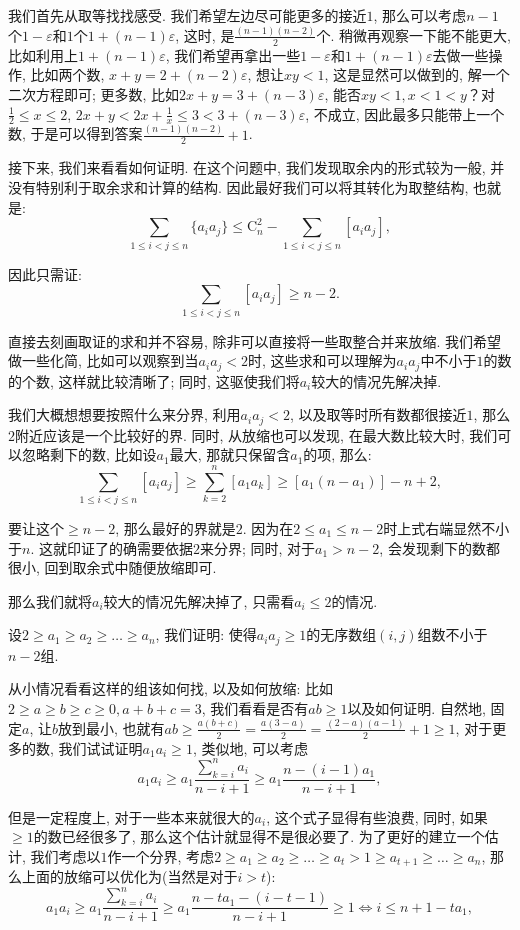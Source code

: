 \documentclass[lang=cn,12pt,thmcnt=section]{elegantbook}
\begin{document}
\begin{analysis}
我们首先从取等找找感受. 我们希望左边尽可能更多的接近$1$, 那么可以考虑$n-1$个$1-\varepsilon$和$1$个$1+(n-1)\varepsilon$, 这时, 是$\frac{(n-1)(n-2)}{2}$个. 稍微再观察一下能不能更大, 比如利用上$1+(n-1)\varepsilon$, 我们希望再拿出一些$1-\varepsilon$和$1+(n-1)\varepsilon$去做一些操作, 比如两个数, $x+y=2+(n-2)\varepsilon$, 想让$xy<1$, 这是显然可以做到的, 解一个二次方程即可; 更多数, 比如$2x+y=3+(n-3)\varepsilon$, 能否$xy<1,x<1<y$？对$\frac{1}{2}\le x\le 2$, $2x+y<2x+\frac{1}{x}\le 3<3+(n-3)\varepsilon$, 不成立, 因此最多只能带上一个数, 于是可以得到答案$\frac{(n-1)(n-2)}{2}+1$.

接下来, 我们来看看如何证明. 在这个问题中, 我们发现取余内的形式较为一般, 并没有特别利于取余求和计算的结构. 因此最好我们可以将其转化为取整结构, 也就是: 
\[
\sum_{1\le i<j\le n}\{a_ia_j\}\le \mathrm{C}_{n}^2 -\sum_{1\le i<j \le n}[a_ia_j],
\]

因此只需证: 
\[
\sum_{1\le i<j \le n}[a_ia_j]\ge n-2.
\]

直接去刻画取证的求和并不容易, 除非可以直接将一些取整合并来放缩. 我们希望做一些化简, 比如可以观察到当$a_ia_j<2$时, 这些求和可以理解为$a_ia_j$中不小于$1$的数的个数, 这样就比较清晰了; 同时, 这驱使我们将$a_i$较大的情况先解决掉. 

我们大概想想要按照什么来分界, 利用$a_ia_j<2$, 以及取等时所有数都很接近$1$, 那么$2$附近应该是一个比较好的界. 同时, 从放缩也可以发现, 在最大数比较大时, 我们可以忽略剩下的数, 比如设$a_1$最大, 那就只保留含$a_1$的项, 那么: 
\[
\sum_{1\le i<j \le n}[a_ia_j]\ge \sum_{k=2}^n [a_1a_k]\ge [a_1(n-a_1)]-n+2,
\]

要让这个$\ge n-2$, 那么最好的界就是$2$. 因为在$2\le a_1\le n-2$时上式右端显然不小于$n$. 这就印证了的确需要依据$2$来分界; 同时, 对于$a_1>n-2$, 会发现剩下的数都很小, 回到取余式中随便放缩即可. 

那么我们就将$a_i$较大的情况先解决掉了, 只需看$a_i\le 2$的情况. 

设$2\ge a_1 \ge a_2\ge\dots{}\ge a_n$, 我们证明: 使得$a_ia_j\ge 1$的无序数组$(i,j)$组数不小于$n-2$组.

从小情况看看这样的组该如何找, 以及如何放缩: 比如$2\ge a\ge b\ge c\ge 0,a+b+c=3$, 我们看看是否有$ab\ge 1$以及如何证明. 自然地, 固定$a$, 让$b$放到最小, 也就有$ab\ge \frac{a(b+c)}{2}=\frac{a(3-a)}{2}=\frac{(2-a)(a-1)}{2}+1\ge 1$, 对于更多的数, 我们试试证明$a_1a_i\ge 1$, 类似地, 可以考虑
\[
a_1a_i\ge a_1\frac{\sum_{k=i}^n a_i}{n-i+1}\ge a_1\frac{n-(i-1)a_1}{n-i+1},
\]

但是一定程度上, 对于一些本来就很大的$a_i$, 这个式子显得有些浪费, 同时, 如果$\ge1$的数已经很多了, 那么这个估计就显得不是很必要了. 为了更好的建立一个估计, 我们考虑以$1$作一个分界, 考虑$2\ge a_1 \ge a_2\ge\dots{}\ge a_t>1\ge a_{t+1}\ge  \dots{}\ge a_n$, 那么上面的放缩可以优化为(当然是对于$i>t$): 
\[
a_1a_i\ge a_1\frac{\sum_{k=i}^n a_i}{n-i+1}\ge a_1\frac{n-ta_1-(i-t-1)}{n-i+1}\ge 1 \Leftrightarrow i\le n+1-ta_1,
\]


\end{analysis}
\end{document}

